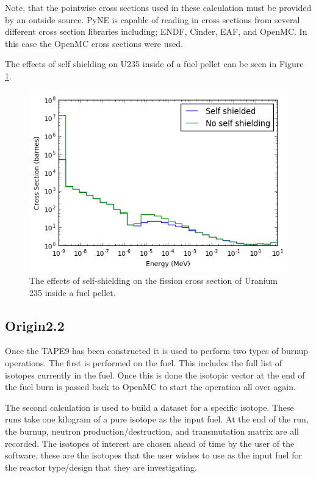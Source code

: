 \documentclass{article}
\begin{document}
Note, that the pointwise cross sections used in these calculation must be provided by an outside source. PyNE is capable of reading in cross sections from several different cross section libraries including; ENDF, Cinder, EAF, and OpenMC. In this case the OpenMC cross sections were used.

The effects of self shielding on U235 inside of a fuel pellet can be seen in Figure \ref{fig:index}.
\begin{figure}[h]
  \center
  \includegraphics[scale=0.8]{index.png}
  \caption{The effects of self-shielding on the fission cross section of Uranium 235 inside a fuel pellet.}
  \label{fig:index}
\end{figure}

\subsection{Origin2.2}
Once the TAPE9 has been constructed it is used to perform two types of burnup operations. The first is performed on the fuel. This includes the full list of isotopes currently in the fuel. Once this is done the isotopic vector at the end of the fuel burn is passed back to OpenMC to start the operation all over again.

The second calculation is used to build a dataset for a specific isotope. These runs take one kilogram of a pure isotope as the input fuel. At the end of the run, the burnup, neutron production/destruction, and transmutation matrix are all recorded. The isotopes of interest are chosen ahead of time by the user of the software, these are the isotopes that the user wishes to use as the input fuel for the reactor type/design that they are investigating. 
\end{document}
